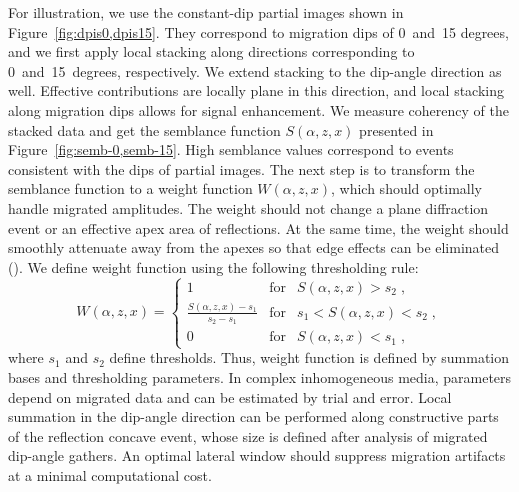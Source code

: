 For illustration, we use the constant-dip partial images shown in Figure~\ref{fig:dpis0,dpis15}. They correspond to migration dips of 0~and~15 degrees, 
and we first apply local stacking along directions corresponding to 0~and~15~degrees, respectively. We extend stacking to the dip-angle direction
as well. Effective contributions are locally plane in this direction, and local stacking along migration dips allows for signal enhancement.
We measure coherency of the stacked data and get the semblance function $S(\alpha, z, x)$ presented in Figure~\ref{fig:semb-0,semb-15}. 
High semblance values correspond to events consistent with the dips of partial images. The next step is to transform the semblance function
to a weight function $W(\alpha, z, x)$, which should optimally handle migrated amplitudes. The weight should not change a plane diffraction
event or an effective apex area of reflections. At the same time, the weight should smoothly attenuate away from the apexes so that 
edge effects can be eliminated (\citealp[]{hertweck03}). We define  weight function using the following thresholding rule:
\begin{equation}
W(\alpha, z, x) = 
\left\{ \begin{array}{rcl}
1 & \mbox{for} & S(\alpha, z, x) > s_2\;, \\ 
\frac {S(\alpha, z, x) - s_1}{s_2 - s_1} & \mbox{for} & s_1 < S(\alpha, z, x) < s_2\;, \\
0 & \mbox{for} & S(\alpha, z, x) < s_1\;,
\end{array}\right.
\end {equation}
where $s_1$ and $s_2$ define  thresholds. Thus, weight function is defined by summation bases and thresholding parameters. In complex inhomogeneous media,  parameters depend on migrated data and can be estimated by trial and error. Local summation in the dip-angle direction can
be performed along constructive parts of the reflection concave event, whose size is defined after analysis of migrated dip-angle gathers.
An optimal lateral window should suppress migration artifacts at a minimal computational cost.


